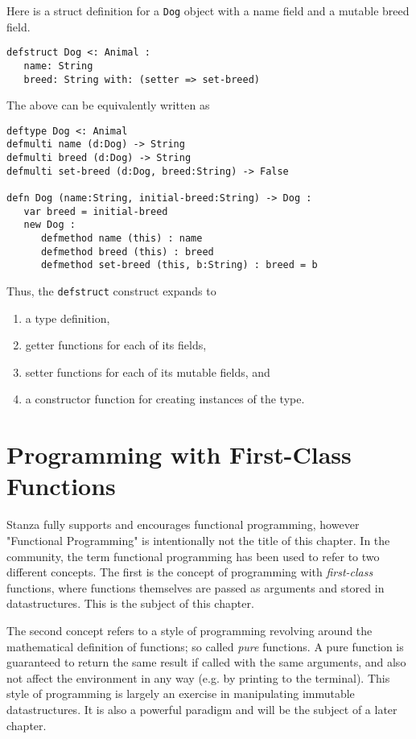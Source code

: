 \documentclass[10pt,oneside]{book}
\begin{document}
Here is a struct definition for a \texttt{\frenchspacing Dog} object with a name field and a mutable breed field. 
\begin{lstlisting}
defstruct Dog <: Animal :
   name: String
   breed: String with: (setter => set-breed)
\end{lstlisting}

The above can be equivalently written as
\begin{lstlisting}
deftype Dog <: Animal
defmulti name (d:Dog) -> String
defmulti breed (d:Dog) -> String
defmulti set-breed (d:Dog, breed:String) -> False

defn Dog (name:String, initial-breed:String) -> Dog :
   var breed = initial-breed
   new Dog :
      defmethod name (this) : name
      defmethod breed (this) : breed
      defmethod set-breed (this, b:String) : breed = b
\end{lstlisting}
Thus, the \texttt{\frenchspacing defstruct} construct expands to
\begin{enumerate}
\item a type definition,
\item getter functions for each of its fields,
\item setter functions for each of its mutable fields, and
\item a constructor function for creating instances of the type.
\end{enumerate}

\chapter{Programming with First-Class Functions}
Stanza fully supports and encourages functional programming, however "Functional Programming" is intentionally not the title of this chapter. In the community, the term functional programming has been used to refer to two different concepts. The first is the concept of programming with {\em first-class} functions, where functions themselves are passed as arguments and stored in datastructures. This is the subject of this chapter. 

The second concept refers to a style of programming revolving around the mathematical definition of functions; so called {\em pure} functions. A pure function is guaranteed to return the same result if called with the same arguments, and also not affect the environment in any way (e.g. by printing to the terminal). This style of programming is largely an exercise in manipulating immutable datastructures. It is also a powerful paradigm and will be the subject of a later chapter. 
\end{document}
